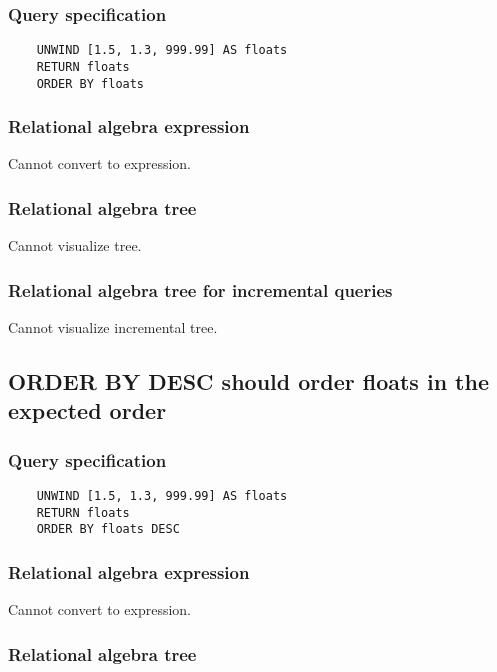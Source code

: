 	\subsubsection*{Query specification}

	\begin{lstlisting}
	UNWIND [1.5, 1.3, 999.99] AS floats
	RETURN floats
	ORDER BY floats
	\end{lstlisting}


	\subsubsection*{Relational algebra expression}

	Cannot convert to expression.

	\subsubsection*{Relational algebra tree}

	Cannot visualize tree.

	\subsubsection*{Relational algebra tree for incremental queries}

	Cannot visualize incremental tree.
	\subsection{ORDER BY DESC should order floats in the expected order}

	\subsubsection*{Query specification}

	\begin{lstlisting}
	UNWIND [1.5, 1.3, 999.99] AS floats
	RETURN floats
	ORDER BY floats DESC
	\end{lstlisting}


	\subsubsection*{Relational algebra expression}

	Cannot convert to expression.

	\subsubsection*{Relational algebra tree}

